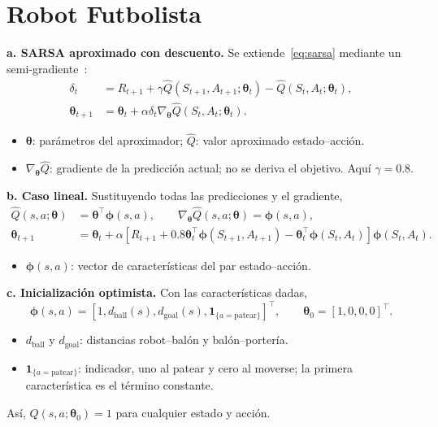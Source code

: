 \section{Robot Futbolista}

\textbf{a. SARSA aproximado con descuento.} Se extiende~\eqref{eq:sarsa} mediante un semi-gradiente~\cite[seccs.~9.1 y 10.1]{sutton}:
\begin{equation}\label{eq:approximate-sarsa}
\begin{aligned}
    \delta_t&=R_{t+1}+\gamma\hat Q(S_{t+1},A_{t+1};\boldsymbol{\theta}_t)
                         -\hat Q(S_t,A_t;\boldsymbol{\theta}_t),\\
    \boldsymbol{\theta}_{t+1}&=\boldsymbol{\theta}_t+
        \alpha\delta_t\nabla_{\boldsymbol{\theta}}\hat Q(S_t,A_t;\boldsymbol{\theta}_t).
\end{aligned}
\end{equation}
\begin{itemize}
    \item $\boldsymbol{\theta}$: parámetros del aproximador; $\hat Q$: valor aproximado estado--acción.
    \item $\nabla_{\boldsymbol{\theta}}\hat Q$: gradiente de la predicción actual; no se deriva el objetivo. Aquí $\gamma=0.8$.
\end{itemize}

\textbf{b. Caso lineal.} Sustituyendo todas las predicciones y el gradiente,
\begin{equation}\label{eq:linear-sarsa}
\begin{aligned}
    \hat Q(s,a;\boldsymbol{\theta})&=\boldsymbol{\theta}^{\top}\boldsymbol{\phi}(s,a),
    \qquad\nabla_{\boldsymbol{\theta}}\hat Q(s,a;\boldsymbol{\theta})=\boldsymbol{\phi}(s,a),\\
    \boldsymbol{\theta}_{t+1}&=\boldsymbol{\theta}_t+
    \alpha\left[R_{t+1}+0.8\boldsymbol{\theta}_t^{\top}\boldsymbol{\phi}(S_{t+1},A_{t+1})
    -\boldsymbol{\theta}_t^{\top}\boldsymbol{\phi}(S_t,A_t)\right]\boldsymbol{\phi}(S_t,A_t).
\end{aligned}
\end{equation}
\begin{itemize}
    \item $\boldsymbol{\phi}(s,a)$: vector de características del par estado--acción.
\end{itemize}

\textbf{c. Inicialización optimista.} Con las características dadas,
\begin{equation}\label{eq:robot-features}
    \boldsymbol{\phi}(s,a)=
    [1,d_{\mathrm{ball}}(s),d_{\mathrm{goal}}(s),\mathbf{1}_{\{a=\mathrm{patear}\}}]^{\top},
    \qquad \boldsymbol{\theta}_0=[1,0,0,0]^{\top}.
\end{equation}
\begin{itemize}
    \item $d_{\mathrm{ball}}$ y $d_{\mathrm{goal}}$: distancias robot--balón y balón--portería.
    \item $\mathbf{1}_{\{a=\mathrm{patear}\}}$: indicador, uno al patear y cero al moverse; la primera característica es el término constante.
\end{itemize}
Así, $\hat Q(s,a;\boldsymbol{\theta}_0)=1$ para cualquier estado y acción.

